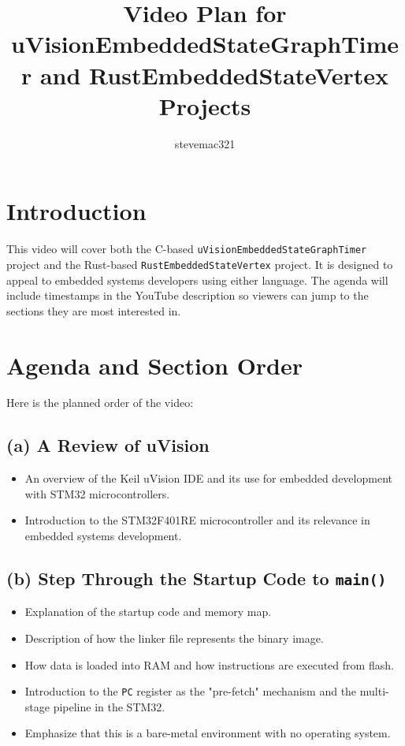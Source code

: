 \documentclass{article}
\title{Video Plan for uVisionEmbeddedStateGraphTimer and RustEmbeddedStateVertex Projects}
\author{stevemac321}
\date{}
\begin{document}
\maketitle

\section{Introduction}
This video will cover both the C-based \texttt{uVisionEmbeddedStateGraphTimer} project and the Rust-based \texttt{RustEmbeddedStateVertex} project. It is designed to appeal to embedded systems developers using either language. The agenda will include timestamps in the YouTube description so viewers can jump to the sections they are most interested in.

\section{Agenda and Section Order}
Here is the planned order of the video:

\subsection{(a) A Review of uVision}
\begin{itemize}
    \item An overview of the Keil uVision IDE and its use for embedded development with STM32 microcontrollers.
    \item Introduction to the STM32F401RE microcontroller and its relevance in embedded systems development.
\end{itemize}

\subsection{(b) Step Through the Startup Code to \texttt{main()}}
\begin{itemize}
    \item Explanation of the startup code and memory map.
    \item Description of how the linker file represents the binary image.
    \item How data is loaded into RAM and how instructions are executed from flash.
    \item Introduction to the \texttt{PC} register as the "pre-fetch" mechanism and the multi-stage pipeline in the STM32.
    \item Emphasize that this is a bare-metal environment with no operating system.
\end{itemize}
\end{document}
